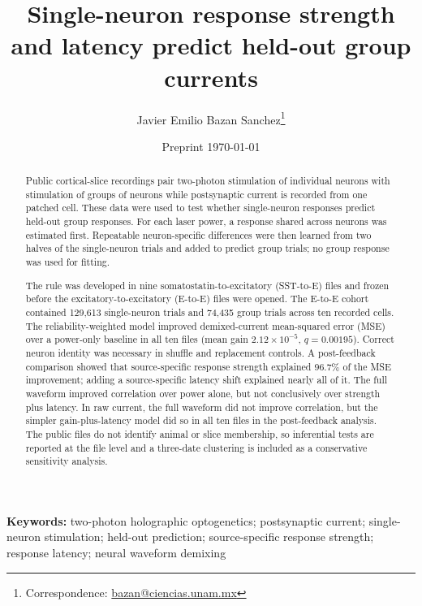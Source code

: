 \documentclass[10pt,twocolumn]{article}
\title{\color{ink}\bfseries Single-neuron response strength and latency predict held-out group currents}
\author[1]{Javier Emilio Bazan Sanchez\thanks{Correspondence: \href{mailto:bazan@ciencias.unam.mx}{bazan@ciencias.unam.mx}}}
\affil[1]{Faculty of Sciences, National Autonomous University of Mexico (UNAM), Mexico City, Mexico}
\date{Preprint \textbar{} \today}
\begin{document}
\raggedbottom

\maketitle

\begin{abstract}
Public cortical-slice recordings pair two-photon stimulation of individual
neurons with stimulation of groups of neurons while postsynaptic current is
recorded from one patched cell. These data were used to test whether
single-neuron responses predict held-out group responses. For each laser
power, a response shared across neurons was estimated first. Repeatable
neuron-specific differences were then learned from two halves of the
single-neuron trials and added to predict group trials; no group response was
used for fitting.

The rule was developed in nine somatostatin-to-excitatory (SST-to-E) files
and frozen before the excitatory-to-excitatory (E-to-E) files were opened.
The E-to-E cohort contained 129,613 single-neuron trials and 74,435
group trials across ten recorded cells. The reliability-weighted model
improved demixed-current mean-squared error (MSE) over a power-only baseline
in all ten files (mean gain $2.12\times10^{-5}$, $q=0.00195$). Correct neuron
identity was necessary in shuffle and replacement controls. A post-feedback
comparison showed that source-specific response strength explained 96.7\% of
the MSE improvement; adding a source-specific latency shift explained nearly
all of it. The full waveform improved correlation over power alone, but not
conclusively over strength plus latency. In raw current, the full waveform did
not improve correlation, but the simpler gain-plus-latency model did so in all
ten files in the post-feedback analysis. The public files do not identify
animal or slice membership, so inferential tests are reported at the file
level and a three-date clustering is included as a conservative sensitivity
analysis.
\end{abstract}

\noindent\textbf{Keywords:} two-photon holographic optogenetics;
postsynaptic current; single-neuron stimulation; held-out prediction;
source-specific response strength; response latency; neural waveform demixing
\end{document}
